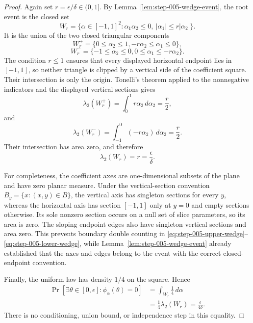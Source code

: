 \begin{proof}
Again set $r=\epsilon/\delta\in(0,1]$.  By
Lemma~\ref{lem:step-005-wedge-event}, the root event is the closed set
\[
W_r=\{\alpha\in[-1,1]^2:
\alpha_1\alpha_2\leq0,\ |\alpha_1|\leq r|\alpha_2|\}.
\]
It is the union of the two closed triangular components
\[
W_r^+=\{0\leq\alpha_2\leq1,
-r\alpha_2\leq\alpha_1\leq0\},
\]
\[
W_r^-=\{-1\leq\alpha_2\leq0,
0\leq\alpha_1\leq-r\alpha_2\}.
\]
The condition $r\leq1$ ensures that every displayed horizontal endpoint
lies in $[-1,1]$, so neither triangle is clipped by a vertical side of the
coefficient square.  Their intersection is only the origin.  Tonelli's
theorem applied to the nonnegative indicators and the displayed vertical
sections gives
\begin{equation}
\lambda_2(W_r^+)
=\int_0^1r\alpha_2\,d\alpha_2
=\frac r2,
\label{eq:step-005-upper-wedge}
\end{equation}
and
\begin{equation}
\lambda_2(W_r^-)
=\int_{-1}^0(-r\alpha_2)\,d\alpha_2
=\frac r2.
\label{eq:step-005-lower-wedge}
\end{equation}
Their intersection has area zero, and therefore
\begin{equation}
\lambda_2(W_r)=r=\frac\epsilon\delta.
\label{eq:step-005-wedge-area}
\end{equation}

For completeness, the coefficient axes are one-dimensional subsets of the
plane and have zero planar measure.  Under the vertical-section convention
$B_y=\{x:(x,y)\in B\}$, the vertical axis has singleton sections for every
$y$, whereas the horizontal axis has section $[-1,1]$ only at $y=0$ and
empty sections otherwise.  Its sole nonzero section occurs on a null set of
slice parameters, so its area is zero.  The sloping endpoint edges also have
singleton vertical sections and area zero.  This prevents boundary double
counting in \eqref{eq:step-005-upper-wedge}--
\eqref{eq:step-005-lower-wedge}, while
Lemma~\ref{lem:step-005-wedge-event} already established that the axes and
edges belong to the event with the correct closed-endpoint convention.

Finally, the uniform law has density $1/4$ on the square.  Hence
\[
\begin{aligned}
\Pr\!\left[\exists\theta\in[0,\epsilon]:
\phi_\alpha(\theta)=0\right]
&=\int_{W_r}\frac14\,d\alpha\\
&=\frac14\lambda_2(W_r)
=\frac\epsilon{4\delta}.
\end{aligned}
\]
There is no conditioning, union bound, or independence step in this
equality.
\end{proof}

